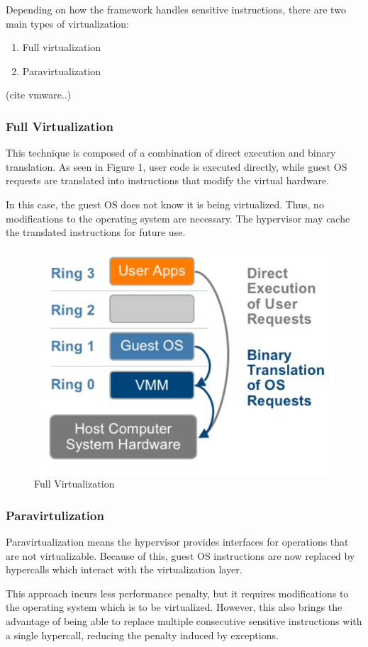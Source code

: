 Depending on how the framework handles sensitive instructions, there are two main types of virtualization:
\begin{enumerate}
\item
Full virtualization
\item
Paravirtualization
\end{enumerate}
(cite vmware..)

\subsubsection{Full Virtualization}
\label{subsubsec:fullvirt}

This technique is composed of a combination of direct execution and binary translation.
As seen in Figure 1, user code is executed directly, while guest OS requests are translated into instructions that modify the virtual hardware.

In this case, the guest OS does not know it is being virtualized. Thus, no modifications to the operating system are necessary. The hypervisor may cache the translated instructions for future use.

\begin{figure}[h]
\centering
  \includegraphics[width=.35\linewidth]{img/fullvirt.png}
  \caption{Full Virtualization}
\end{figure}


\subsubsection{Paravirtulization}
\label{subsubsec:paravirt}

Paravirtualization means the hypervisor provides interfaces for operations that are not virtualizable. Because of this, guest OS instructions are now replaced by hypercalls which interact with the virtualization layer.

This approach incurs less performance penalty, but it requires modifications to the operating system which is to be virtualized. However, this also brings the advantage of being able to replace multiple consecutive sensitive instructions with a single hypercall, reducing the penalty induced by exceptions.


